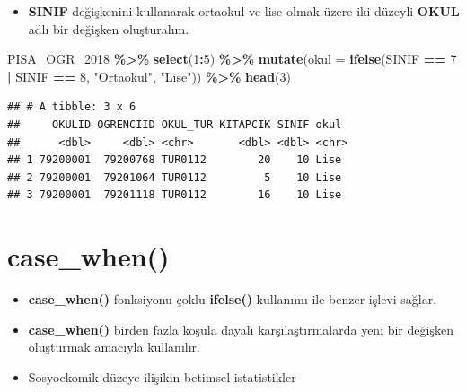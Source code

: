 \documentclass[
  oneside]{book}
\newenvironment{Shaded}{\begin{snugshade}}{\end{snugshade}}
\newcommand{\AttributeTok}[1]{\textcolor[rgb]{0.13,0.29,0.53}{#1}}
\newcommand{\DecValTok}[1]{\textcolor[rgb]{0.00,0.00,0.81}{#1}}
\newcommand{\FunctionTok}[1]{\textcolor[rgb]{0.13,0.29,0.53}{\textbf{#1}}}
\newcommand{\NormalTok}[1]{#1}
\newcommand{\SpecialCharTok}[1]{\textcolor[rgb]{0.81,0.36,0.00}{\textbf{#1}}}
\newcommand{\StringTok}[1]{\textcolor[rgb]{0.31,0.60,0.02}{#1}}
\providecommand{\tightlist}{%
  \setlength{\itemsep}{0pt}\setlength{\parskip}{0pt}}
\begin{document}
\begin{itemize}
\tightlist
\item
  \textbf{SINIF} değişkenini kullanarak ortaokul ve lise olmak üzere iki düzeyli \textbf{OKUL} adlı bir değişken oluşturalım.
\end{itemize}

\begin{Shaded}
\begin{Highlighting}[]
\NormalTok{PISA\_OGR\_2018 }\SpecialCharTok{\%\textgreater{}\%}
  \FunctionTok{select}\NormalTok{(}\DecValTok{1}\SpecialCharTok{:}\DecValTok{5}\NormalTok{) }\SpecialCharTok{\%\textgreater{}\%}
  \FunctionTok{mutate}\NormalTok{(}\AttributeTok{okul =} \FunctionTok{ifelse}\NormalTok{(SINIF }\SpecialCharTok{==} \DecValTok{7} \SpecialCharTok{|}\NormalTok{ SINIF }\SpecialCharTok{==} \DecValTok{8}\NormalTok{,}
                       \StringTok{"Ortaokul"}\NormalTok{, }\StringTok{"Lise"}\NormalTok{)) }\SpecialCharTok{\%\textgreater{}\%}
    \FunctionTok{head}\NormalTok{(}\DecValTok{3}\NormalTok{)}
\end{Highlighting}
\end{Shaded}

\begin{verbatim}
## # A tibble: 3 x 6
##     OKULID OGRENCIID OKUL_TUR KITAPCIK SINIF okul 
##      <dbl>     <dbl> <chr>       <dbl> <dbl> <chr>
## 1 79200001  79200768 TUR0112        20    10 Lise 
## 2 79200001  79201064 TUR0112         5    10 Lise 
## 3 79200001  79201118 TUR0112        16    10 Lise
\end{verbatim}

\hypertarget{case_when}{%
\section{case\_when()}\label{case_when}}

\begin{itemize}
\item
  \textbf{case\_when()} fonksiyonu çoklu \textbf{ifelse() } kullanımı ile benzer işlevi sağlar.
\item
  \textbf{case\_when()} birden fazla koşula dayalı karşılaştırmalarda yeni bir değişken oluşturmak amacıyla kullanılır.
\item
  Sosyoekomik düzeye ilişikin betimsel istatistikler
\end{itemize}

\begin{Shaded}
\end{Shaded}
\end{document}
